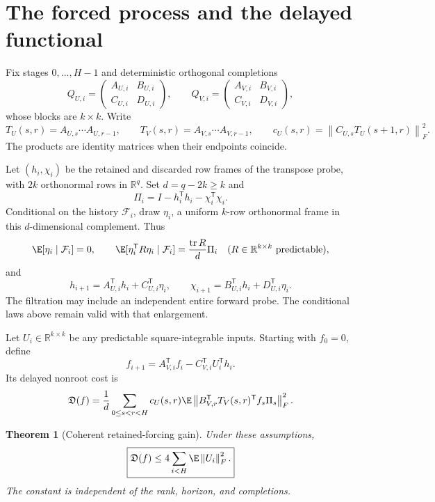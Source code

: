 \documentclass[11pt,oneside,openany,a4paper]{book}
\numberwithin{equation}{chapter}
\newtheorem{theorem}{Theorem}[chapter]
\theoremstyle{definition}
\theoremstyle{remark}
\newcommand{\T}{\mathsf T}\newcommand{\Id}{I}
\newcommand{\F}[1]{\left\lVert#1\right\rVert_F}
\DeclareMathOperator{\tr}{tr}\DeclareMathOperator{\rank}{rank}
\begin{document}
\section{The forced process and the delayed functional}

Fix stages $0,\ldots,H-1$ and deterministic orthogonal completions
\[
 Q_{U,i}=\begin{pmatrix}A_{U,i}&B_{U,i}\\C_{U,i}&D_{U,i}\end{pmatrix},
 \qquad
 Q_{V,i}=\begin{pmatrix}A_{V,i}&B_{V,i}\\C_{V,i}&D_{V,i}\end{pmatrix},
\]
whose blocks are $k\times k$. Write
\[
 T_U(s,r)=A_{U,s}\cdots A_{U,r-1},\qquad
 T_V(s,r)=A_{V,s}\cdots A_{V,r-1},
 \qquad c_U(s,r)=\F{C_{U,s}T_U(s+1,r)}^2.
\]
The products are identity matrices when their endpoints coincide.

Let $(h_i,\chi_i)$ be the retained and discarded row frames of the
transpose probe, with $2k$ orthonormal rows in $\mathbb R^q$.
Set $d=q-2k\ge k$ and
\[
 \Pi_i=I-h_i^\T h_i-\chi_i^\T\chi_i.
\]
Conditional on the history $\mathcal F_i$, draw $\eta_i$, a uniform
$k$-row orthonormal frame in this $d$-dimensional complement. Thus
\[
 \E[\eta_i\mid\mathcal F_i]=0,\qquad
 \E[\eta_i^\T R\eta_i\mid\mathcal F_i]=\frac{\tr R}{d}\Pi_i
 \quad(R\in\mathbb R^{k\times k}\text{ predictable}),
\]
and
\[
 h_{i+1}=A_{U,i}^\T h_i+C_{U,i}^\T\eta_i,\qquad
 \chi_{i+1}=B_{U,i}^\T h_i+D_{U,i}^\T\eta_i.
\]
The filtration may include an independent entire forward probe. The
conditional laws above remain valid with that enlargement.

Let $U_i\in\mathbb R^{k\times k}$ be any predictable square-integrable
inputs. Starting with $f_0=0$, define
\begin{equation}\label{drift:eq:forced}
 f_{i+1}=A_{V,i}^\T f_i-C_{V,i}^\T U_i^\T h_i.
\end{equation}
Its delayed nonroot cost is
\begin{equation}\label{drift:eq:cost}
 \mathfrak D(f)=\frac1d\sum_{0\le s<r<H}c_U(s,r)
 \E\F{B_{V,r}^\T T_V(s,r)^\T f_s\Pi_s}^2.
\end{equation}

\begin{theorem}[Coherent retained-forcing gain]\label{drift:thm:gain}
Under these assumptions,
\begin{equation}\label{drift:eq:gain}
 \boxed{\mathfrak D(f)\le4\sum_{i<H}\E\F{U_i}^2.}
\end{equation}
The constant is independent of the rank, horizon, and completions.
\end{theorem}
\end{document}
